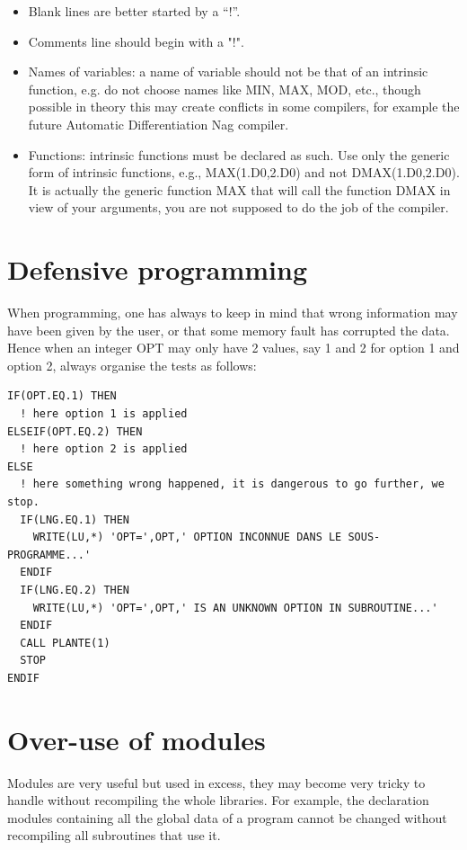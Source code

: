 \begin{itemize}
not standard Fortran,
\item Blank lines are better started by a “!”.
\item Comments line should begin with a "!".
\item Names of variables: a name of variable should not be that of an intrinsic
function, e.g. do not choose names like MIN, MAX, MOD, etc., though possible in
theory this may create conflicts in some compilers, for example the future
Automatic Differentiation Nag compiler.
\item Functions: intrinsic functions must be declared as such. Use only the
generic form of intrinsic functions, e.g., MAX(1.D0,2.D0) and not
DMAX(1.D0,2.D0). It is actually the generic function MAX that will call the
function DMAX in view of your arguments, you are not supposed to do the job of
the compiler.
\end{itemize}

\section{Defensive programming}

When programming, one has always to keep in mind that wrong information may
have been given by the user, or that some memory fault has corrupted the data.
Hence when an integer OPT may only have 2 values, say 1 and 2 for option 1 and
option 2, always organise the tests as follows:\\
\begin{lstlisting}
IF(OPT.EQ.1) THEN
  ! here option 1 is applied
ELSEIF(OPT.EQ.2) THEN
  ! here option 2 is applied
ELSE
  ! here something wrong happened, it is dangerous to go further, we stop.
  IF(LNG.EQ.1) THEN
    WRITE(LU,*) 'OPT=',OPT,' OPTION INCONNUE DANS LE SOUS-PROGRAMME...'
  ENDIF
  IF(LNG.EQ.2) THEN
    WRITE(LU,*) 'OPT=',OPT,' IS AN UNKNOWN OPTION IN SUBROUTINE...'
  ENDIF
  CALL PLANTE(1)
  STOP
ENDIF
\end{lstlisting}

\section{Over-use of modules}

Modules are very useful but used in excess, they may become very tricky to
handle without recompiling the whole libraries. For example, the declaration
modules containing all the global data of a program cannot be changed without
recompiling all subroutines that use it.\\

